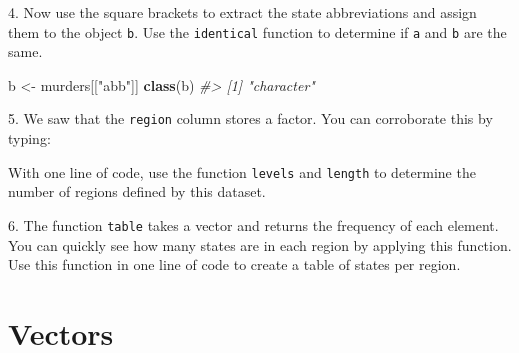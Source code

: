 \documentclass[
]{krantz}
\newenvironment{Shaded}{\begin{snugshade}}{\end{snugshade}}
\newcommand{\CommentTok}[1]{\textcolor[rgb]{0.37,0.37,0.37}{\textit{#1}}}
\newcommand{\KeywordTok}[1]{\textcolor[rgb]{0.27,0.27,0.27}{\textbf{#1}}}
\newcommand{\NormalTok}[1]{#1}
\newcommand{\OperatorTok}[1]{\textcolor[rgb]{0.43,0.43,0.43}{\textbf{#1}}}
\newcommand{\StringTok}[1]{\textcolor[rgb]{0.5,0.5,0.5}{#1}}
\begin{document}
4. Now use the square brackets to extract the state abbreviations and assign them to the object \texttt{b}. Use the \texttt{identical} function to determine if \texttt{a} and \texttt{b} are the same.

\begin{Shaded}
\begin{Highlighting}[]
\NormalTok{b <-}\StringTok{ }\NormalTok{murders[[}\StringTok{"abb"}\NormalTok{]]}
\KeywordTok{class}\NormalTok{(b)}
\CommentTok{#> [1] "character"}
\end{Highlighting}
\end{Shaded}

5. We saw that the \texttt{region} column stores a factor. You can corroborate this by typing:

\begin{Shaded}
\end{Shaded}

With one line of code, use the function \texttt{levels} and \texttt{length} to determine the number of regions defined by this dataset.

\begin{Shaded}
\end{Shaded}

6. The function \texttt{table} takes a vector and returns the frequency of each element. You can quickly see how many states are in each region by applying this function. Use this function in one line of code to create a table of states per region.

\begin{Shaded}
\end{Shaded}

\hypertarget{vectors}{%
\section{Vectors}\label{vectors}}
\end{document}
